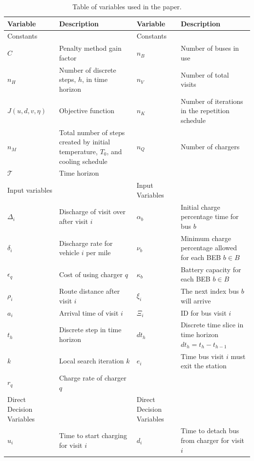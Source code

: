 \documentclass[11pt,a4paper,final]{article}
\newcommand{\T}{\mathcal{T}}                %
\newcommand{\Tau}{T}                        %
\newcommand{\Bset}{B}                       %
\begin{document}
\begin{table}[htbp]
\caption{\label{tab:variables}Table of variables used in the paper.}
\centering
\begin{tabularx}{\textwidth}{L{0.3} L{1.2} L{0.3} L{1.2}}
\textbf{Variable} & \textbf{Description} & \textbf{Variable} & \textbf{Description}\\[0pt]
\hline
Constants &  & Constants & \\[0pt]
\(C\) & Penalty method gain factor & \(n_B\) & Number of buses in use\\[0pt]
\(n_H\) & Number of discrete steps, \(h\), in time horizon & \(n_V\) & Number of total visits\\[0pt]
\(J(u,d,v,\eta)\) & Objective function & \(n_K\) & Number of iterations in the repetition schedule\\[0pt]
\(n_M\) & Total number of steps created by initial temperature, \(\Tau_0\), and cooling schedule & \(n_Q\) & Number of chargers\\[0pt]
\(\T\) & Time horizon &  & \\[0pt]
\hline
Input variables &  & Input Variables & \\[0pt]
\(\Delta_i\) & Discharge of visit over after visit \(i\) & \(\alpha_b\) & Initial charge percentage time for bus \(b\)\\[0pt]
\(\delta_i\) & Discharge rate for vehicle \(i\) per mile & \(\nu_b\) & Minimum charge percentage allowed for each BEB \(b \in \Bset\)\\[0pt]
\(\epsilon_q\) & Cost of using charger \(q\) & \(\kappa_b\) & Battery capacity for each BEB \(b \in \Bset\)\\[0pt]
\(\rho_i\) & Route distance after visit \(i\) & \(\xi_i\) & The next index bus \(b\) will arrive\\[0pt]
\(a_i\) & Arrival time of visit \(i\) & \(\Xi_i\) & ID for bus visit \(i\)\\[0pt]
\(t_h\) & Discrete step in time horizon & \(dt_h\) & Discrete time slice in time horizon \(dt_h = t_h - t_{h-1}\)\\[0pt]
\(k\) & Local search iteration \(k\) & \(e_i\) & Time bus visit \(i\) must exit the station\\[0pt]
\(r_q\) & Charge rate of charger \(q\) &  & \\[0pt]
\hline
Direct Decision Variables &  & Direct Decision Variables & \\[0pt]
\(u_i\) & Time to start charging for visit \(i\) & \(d_i\) & Time to detach bus from charger for visit \(i\)\\[0pt]

\end{tabularx}
\end{table}
\end{document}
